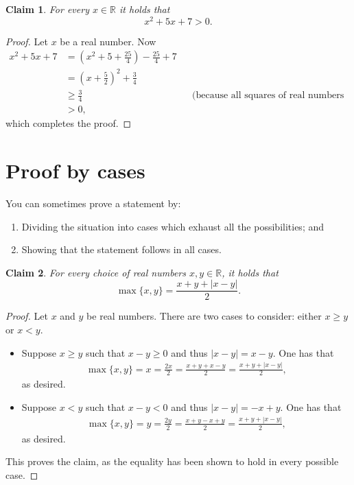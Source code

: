 \documentclass[11pt]{article}
\theoremstyle{plain}
\newtheorem*{claim}{Claim}
\theoremstyle{plain}
\theoremstyle{remark}
\def\reals{\mathbb{R}}
\begin{document}
\begin{tcolorbox}
\begin{claim}
 For every $x\in\reals$ it holds that 
 \[
  x^2+5x+7 >0.
 \]
\end{claim}
\end{tcolorbox}
\begin{proof}
 Let $x$ be a real number. Now
 \begin{align*}
  x^2+5x+7 & = \left(x^2+5+\frac{25}{4}\right) - \frac{25}{4} + 7\\
           & = \left(x+\frac{5}{2}\right)^2 + \frac{3}{4}\\
           & \geq \frac{3}{4} && \text{(because all squares of real numbers are non-negative)}\\
           & >0,
 \end{align*}
which completes the proof.
\end{proof}

\section*{Proof by cases}
You can sometimes prove a statement by:
\begin{enumerate}
 \item Dividing the situation into cases which exhaust all the possibilities; and
 \item Showing that the statement follows in all cases.
\end{enumerate}


\begin{tcolorbox}
\begin{claim}
 For every choice of real numbers $x,y\in\reals$, it holds that
 \[
  \max\{x,y\} = \frac{x+y+|x-y|}{2}.
 \]
\end{claim}
\end{tcolorbox}
\begin{proof}
Let $x$ and $y$ be real numbers.  There are two cases to consider: either $x\geq y$ or $x<y$.
\begin{itemize}
\setlength{\itemindent}{2em}
 \item[Case 1:] Suppose $x\geq y$ such that $x-y\geq0$ and thus $|x-y| = x-y$. One has that
 \begin{align*}
  \max\{x,y\} = x = \frac{2x}{2} = \frac{x+y + x - y}{2} = \frac{x+y + |x-y|}{2},
 \end{align*}
as desired.
\item[Case 1:] Suppose $x< y$ such that $x-y<0$ and thus $|x-y| = -x+y$. One has that
 \begin{align*}
  \max\{x,y\} = y = \frac{2y}{2} = \frac{x+y - x + y}{2} = \frac{x+y + |x-y|}{2},
 \end{align*}
as desired.
\end{itemize}
This proves the claim, as the equality has been shown to hold in every possible case.
\end{proof}
\end{document}
